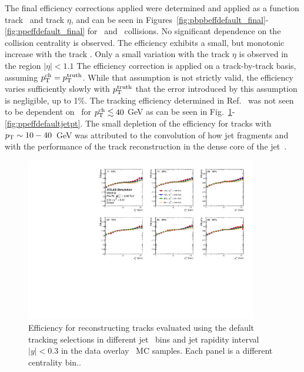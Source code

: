 The final efficiency corrections applied were determined and applied as a function track \pt\ and track $\eta$, and can be seen in Figures~\ref{fig:pbpbeffdefault_final}-\ref{fig:ppeffdefault_final} for \pp\ and \PbPb\ collisions.
No significant dependence on the collision centrality is observed.
The efficiency exhibits a small, but monotonic increase with the track \pt.
Only a small variation with the track $\eta$ is observed in the region $|\eta|<1.1$ The efficiency correction is applied on a track-by-track basis, assuming $\mbox{$p_{\mathrm{T}}^{\mathrm{ch}}$} = \mbox{$p_{\mathrm{T}}^{\mathrm{truth}}$}$.
While that assumption is not strictly valid, the efficiency varies sufficiently slowly with $\mbox{$p_{\mathrm{T}}^{\mathrm{truth}}$}$ that the error introduced by this assumption is negligible, up to 1\%.
The tracking efficiency determined in Ref.~\cite{PhysRevC.98.024908} was not seen to be dependent on \ptjet\ for $\mbox{$p_{\mathrm{T}}^{\mathrm{ch}}$} \lesssim 40$ GeV as can be seen in Fig.~\ref{fig:pbpbeffdefaultjetpt_y0}-\ref{fig:ppeffdefaultjetpt}.
The small depletion of the efficiency for tracks with $\mbox{$p_{\mathrm{T}}$} \sim 10-40$~GeV was attributed to the convolution of how jet fragments and with the performance of the track reconstruction in the dense core of the jet~\cite{PhysRevC.98.024908}.



\begin{figure}[ht]
   \centerline{
      \includegraphics[width=0.9\textwidth]{figures/main/corrections/eff_centrality_jetpt_jety0_ppTight.pdf}
   }
   \caption{Efficiency for reconstructing tracks evaluated using the default tracking selections in different jet \pT\ bins and jet rapidity interval $|y|<0.3$ in the data overlay \pbpb\ MC samples.
Each panel is a different centrality bin..}
   \label{fig:pbpbeffdefaultjetpt_y0}
\end{figure}


